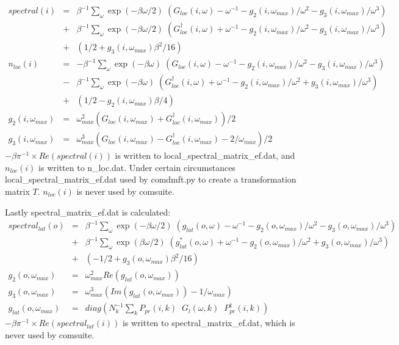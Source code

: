 \documentclass[aps,prb,singlecolumn,preprintnumbers,amsmath,amssymb]{revtex4}
\begin{document}
\begin{eqnarray}
spectral(i) &=&  \beta^{-1}\sum_{\omega} \exp(-\beta \omega/2) \;  (G_{loc}(i,\omega) - \omega^{-1} - g_2(i,\omega_{max}) / \omega^2 - g_3(i,\omega_{max}) / \omega^3) \nonumber \\
&+&  \beta^{-1}\sum_{\omega} \exp(-\beta \omega /2) \;  (G_{loc}^\dagger(i,\omega) + \omega^{-1} - g_2(i,\omega_{max}) / \omega^2 - g_3(i,\omega_{max}) / \omega^3) \nonumber \\
&+&  (1/2 + g_3(i,\omega_{max}) \beta^2/16) \nonumber \\
n_{loc}(i) &=& - \beta^{-1}\sum_{\omega} \exp(-\beta \omega) \;  (G_{loc}(i,\omega) - \omega^{-1} - g_2(i,\omega_{max}) / \omega^2 - g_3(i,\omega_{max}) / \omega^3) \nonumber \\
&-&  \beta^{-1}\sum_{\omega} \exp(-\beta \omega) \;  (G_{loc}^\dagger(i,\omega) + \omega^{-1} - g_2(i,\omega_{max}) / \omega^2 + g_3(i,\omega_{max}) / \omega^3) \nonumber \\
&+&  (1/2 - g_2(i,\omega_{max}) \beta/4) \nonumber \\
g_2(i,\omega_{max}) &=& \omega_{max}^2  (G_{loc}(i,\omega_{max}) + G_{loc}^\dagger(i,\omega_{max}))/2 \nonumber \\
g_3(i,\omega_{max}) &=& \omega_{max}^3  (G_{loc}(i,\omega_{max}) - G_{loc}^\dagger(i,\omega_{max})  - 2/\omega_{max})/2  \nonumber 
\end{eqnarray}
$- \beta \pi^{-1} \times Re(spectral(i))$ is written to local\_spectral\_matrix\_ef.dat, and $n_{loc}(i)$ is written to n\_loc.dat. Under certain circumstances local\_spectral\_matrix\_ef.dat used by comdmft.py to create a transformation matrix $T$. $n_{loc}(i)$ is never used by comsuite.

Lastly spectral\_matrix\_ef.dat is calculated:
\begin{eqnarray}
spectral_{lat}(o) &=&  \beta^{-1}\sum_{\omega} \exp(-\beta \omega/2) \;  (g_{lat}(o,\omega) - \omega^{-1} - g_2(o,\omega_{max}) / \omega^2 - g_3(o,\omega_{max}) / \omega^3) \nonumber \\
&+&  \beta^{-1}\sum_{\omega} \exp(\beta \omega /2) \;  (g_{lat}^*(o,\omega) + \omega^{-1} - g_2(o,\omega_{max}) / \omega^2 + g_3(o,\omega_{max}) / \omega^3) \nonumber \\
&+&  (-1/2 + g_3(o,\omega_{max}) \beta^2/16) \nonumber \\
g_2(o,\omega_{max}) &=& \omega_{max}^2  Re(g_{lat}(o,\omega_{max})) \nonumber \\
g_3(o,\omega_{max}) &=& \omega_{max}^3  (Im(g_{lat}(o,\omega_{max})) - 1/\omega_{max}) \nonumber \\
g_{lat}(o,\omega_{max}) &=& diag(N_k^{-1} \sum_k P_{pr}(i,k)   \;\;G_{l}(\omega, k) \;\; P_{pr}^\dagger(i,k))
\end{eqnarray}
$- \beta \pi^{-1} \times Re(spectral_{lat}(i))$ is written to spectral\_matrix\_ef.dat, which is never used by comsuite.
\end{document}

